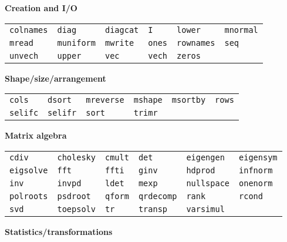 \textbf{Creation and I/O}
\hrulefill

\begin{tabular}{p{\cwid}p{\cwid}p{\cwid}p{\cwid}p{\cwid}p{\cwid}}
\texttt{colnames} &
\texttt{diag} &
\texttt{diagcat} &
\texttt{I} &
\texttt{lower} &
\texttt{mnormal} \\
\texttt{mread} &
\texttt{muniform} &
\texttt{mwrite} &
\texttt{ones} &
\texttt{rownames} &
\texttt{seq} \\
\texttt{unvech} &
\texttt{upper} &
\texttt{vec} &
\texttt{vech} &
\texttt{zeros} & \\ [4pt]
\end{tabular}

\textbf{Shape/size/arrangement}
\hrulefill

\begin{tabular}{p{\cwid}p{\cwid}p{\cwid}p{\cwid}p{\cwid}p{\cwid}}
\texttt{cols} &
\texttt{dsort} &
\texttt{mreverse} &
\texttt{mshape} &
\texttt{msortby} &
\texttt{rows} \\
\texttt{selifc} &
\texttt{selifr} &
\texttt{sort} &
\texttt{trimr} & & \\ [4pt]
\end{tabular}

\textbf{Matrix algebra}
\hrulefill

\begin{tabular}{p{\cwid}p{\cwid}p{\cwid}p{\cwid}p{\cwid}p{\cwid}}
\texttt{cdiv} &
\texttt{cholesky} &
\texttt{cmult} &
\texttt{det} &
\texttt{eigengen} &
\texttt{eigensym} \\
\texttt{eigsolve} &
\texttt{fft} &
\texttt{ffti} &
\texttt{ginv} &
\texttt{hdprod} &
\texttt{infnorm} \\
\texttt{inv} &
\texttt{invpd} &
\texttt{ldet} &
\texttt{mexp} &
\texttt{nullspace} &
\texttt{onenorm} \\
\texttt{polroots} &
\texttt{psdroot} &
\texttt{qform} &
\texttt{qrdecomp} &
\texttt{rank} &
\texttt{rcond} \\
\texttt{svd} &
\texttt{toepsolv} &
\texttt{tr} &
\texttt{transp} &
\texttt{varsimul} & \\ [4pt]
\end{tabular}

\textbf{Statistics/transformations}
\hrulefill

